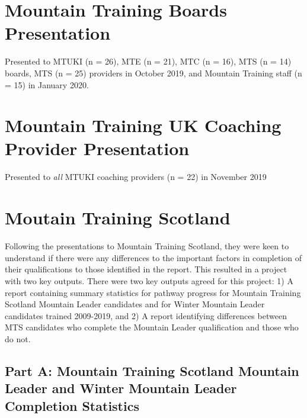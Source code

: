 \documentclass[
  12pt,
  a4paper,
]{book}
\begin{document}
\hypertarget{mountain-training-boards-presentation}{%
\section{Mountain Training Boards Presentation}\label{mountain-training-boards-presentation}}

Presented to MTUKI (n = 26), MTE (n = 21), MTC (n = 16), MTS (n = 14) boards, MTS (n = 25) providers in October 2019, and Mountain Training staff (n = 15) in January 2020.



\hypertarget{mountain-training-uk-coaching-provider-presentation}{%
\section{Mountain Training UK Coaching Provider Presentation}\label{mountain-training-uk-coaching-provider-presentation}}

Presented to \emph{all} MTUKI coaching providers (n = 22) in November 2019



\hypertarget{moutain-training-scotland}{%
\section{Moutain Training Scotland}\label{moutain-training-scotland}}

Following the presentations to Mountain Training Scotland, they were keen to understand if there were any differences to the important factors in completion of their qualifications to those identified in the report. This resulted in a project with two key outputs. There were two key outputs agreed for this project: 1) A report containing summary statistics for pathway progress for Mountain Training Scotland Mountain Leader candidates and for Winter Mountain Leader candidates trained 2009-2019, and 2) A report identifying differences between MTS candidates who complete the Mountain Leader qualification and those who do not.

\hypertarget{part-a-mountain-training-scotland-mountain-leader-and-winter-mountain-leader-completion-statistics}{%
\subsection{Part A: Mountain Training Scotland Mountain Leader and Winter Mountain Leader Completion Statistics}\label{part-a-mountain-training-scotland-mountain-leader-and-winter-mountain-leader-completion-statistics}}
\end{document}
